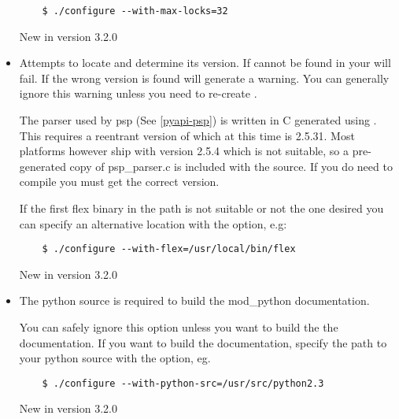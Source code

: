 \begin{itemize}
  \begin{verbatim}
    $ ./configure --with-max-locks=32
  \end{verbatim}                      

  New in version 3.2.0

\item
  Attempts to locate  and determine its version. 
  If  cannot be found in your  
  will fail.  If the wrong version is found  will generate a warning.
  You can generally ignore this warning unless you need to re-create
  .
 
  The parser used by psp (See \ref{pyapi-psp}) is written in C generated using 
  . This requires a reentrant version of  which
  at this time is 2.5.31. Most platforms however ship with version 2.5.4
  which is not suitable, so a pre-generated copy of psp_parser.c is included
  with the source. If you do need to compile  you 
  must get the correct  version.
 
  If the first flex binary in the path is not suitable or not the one desired
  you can specify an alternative location with the 
  option, e.g:
 
  \begin{verbatim}
    $ ./configure --with-flex=/usr/local/bin/flex
  \end{verbatim}

  New in version 3.2.0

\item
  The python source is required to build the mod_python documentation.

  You can safely ignore this option unless you want to build the the
  documentation. If you want to build the documentation, specify the path
  to your python source with the  option, eg.

  \begin{verbatim}
    $ ./configure --with-python-src=/usr/src/python2.3
  \end{verbatim}                      

  New in version 3.2.0

\end{itemize}

